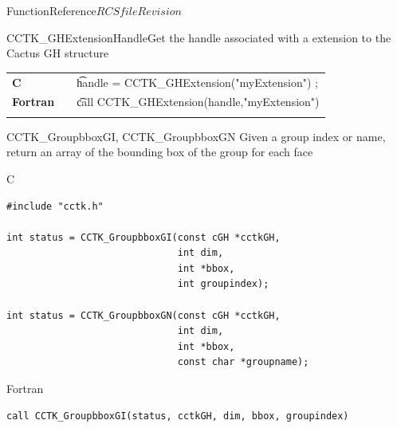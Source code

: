 \begin{cactuspart}{FunctionReference}{$RCSfile$}{$Revision$}
\begin{CCTKFunc}{CCTK\_GHExtensionHandle}{Get the handle associated with a extension to the Cactus GH structure}
\label{CCTK-GHExtensionHandle}
\showargs
\begin{params}
\end{params}
\begin{discussion}
\end{discussion}
\begin{examples}
\begin{tabular}{@{}p{3cm}cp{11cm}}
\hfill {\bf C} && {\t handle =  CCTK\_GHExtension("myExtension") ;}
\\
\hfill {\bf Fortran} && {\t call CCTK\_GHExtension(handle,"myExtension")}\\
\\
\end{tabular}
\end{examples}
\begin{errorcodes}
\end{errorcodes}
\end{CCTKFunc}


\begin{FunctionDescription}{CCTK\_GroupbboxGI, CCTK\_GroupbboxGN}
\label{CCTK-GroupbboxGI}
\label{CCTK-GroupbboxGN}
Given a group index or name, return an array of the bounding box of the group for each face

\begin{SynopsisSection}
\begin{Synopsis}{C}
\begin{verbatim}
#include "cctk.h"

int status = CCTK_GroupbboxGI(const cGH *cctkGH,
                              int dim,
                              int *bbox,
                              int groupindex);

int status = CCTK_GroupbboxGN(const cGH *cctkGH,
                              int dim,
                              int *bbox,
                              const char *groupname);
\end{verbatim}
\end{Synopsis}
\begin{Synopsis}{Fortran}
\begin{verbatim}
call CCTK_GroupbboxGI(status, cctkGH, dim, bbox, groupindex)


\end{verbatim}
\end{Synopsis}
\end{SynopsisSection}
\end{FunctionDescription}
\end{cactuspart}
